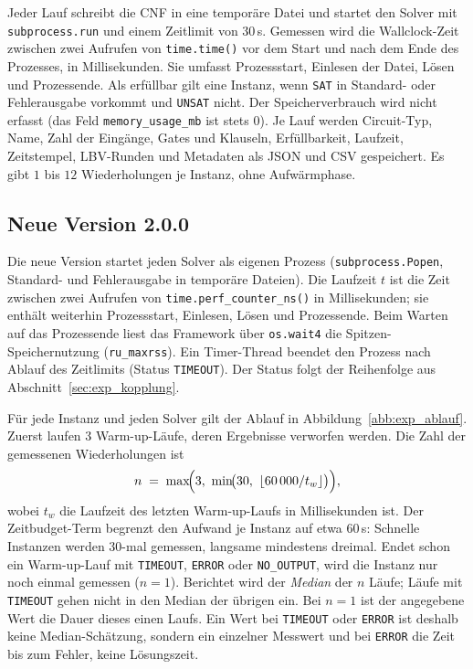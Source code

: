 Jeder Lauf schreibt die CNF in eine temporäre Datei und startet den Solver mit \texttt{subprocess.run} und einem Zeitlimit von $30$\,s. Gemessen wird die Wallclock-Zeit zwischen zwei Aufrufen von \texttt{time.time()} vor dem Start und nach dem Ende des Prozesses, in Millisekunden. Sie umfasst Prozessstart, Einlesen der Datei, Lösen und Prozessende. Als erfüllbar gilt eine Instanz, wenn \texttt{SAT} in Standard- oder Fehlerausgabe vorkommt und \texttt{UNSAT} nicht. Der Speicherverbrauch wird nicht erfasst (das Feld \texttt{memory\_usage\_mb} ist stets $0$). Je Lauf werden Circuit-Typ, Name, Zahl der Eingänge, Gates und Klauseln, Erfüllbarkeit, Laufzeit, Zeitstempel, LBV-Runden und Metadaten als JSON und CSV gespeichert. Es gibt $1$ bis $12$ Wiederholungen je Instanz, ohne Aufwärmphase.

\subsection{Neue Version 2.0.0}
\label{sec:exp_neue_messung}

Die neue Version startet jeden Solver als eigenen Prozess (\texttt{subprocess.Popen}, Standard- und Fehlerausgabe in temporäre Dateien). Die Laufzeit $t$ ist die Zeit zwischen zwei Aufrufen von \texttt{time.perf\_counter\_ns()} in Millisekunden; sie enthält weiterhin Prozessstart, Einlesen, Lösen und Prozessende. Beim Warten auf das Prozessende liest das Framework über \texttt{os.wait4} die Spitzen-Speichernutzung (\texttt{ru\_maxrss}). Ein Timer-Thread beendet den Prozess nach Ablauf des Zeitlimits (Status \texttt{TIMEOUT}). Der Status folgt der Reihenfolge aus Abschnitt~\ref{sec:exp_kopplung}.

Für jede Instanz und jeden Solver gilt der Ablauf in Abbildung~\ref{abb:exp_ablauf}. Zuerst laufen $3$ Warm-up-Läufe, deren Ergebnisse verworfen werden. Die Zahl der gemessenen Wiederholungen ist
\[
n \;=\; \max\!\Bigl(3,\ \min\!\bigl(30,\ \lfloor 60\,000/t_w\rfloor\bigr)\Bigr),
\]
wobei $t_w$ die Laufzeit des letzten Warm-up-Laufs in Millisekunden ist. Der Zeitbudget-Term begrenzt den Aufwand je Instanz auf etwa $60$\,s: Schnelle Instanzen werden $30$-mal gemessen, langsame mindestens dreimal. Endet schon ein Warm-up-Lauf mit \texttt{TIMEOUT}, \texttt{ERROR} oder \texttt{NO\_OUTPUT}, wird die Instanz nur noch einmal gemessen ($n=1$). Berichtet wird der \emph{Median} der $n$ Läufe; Läufe mit \texttt{TIMEOUT} gehen nicht in den Median der übrigen ein. Bei $n=1$ ist der angegebene Wert die Dauer dieses einen Laufs. Ein Wert bei \texttt{TIMEOUT} oder \texttt{ERROR} ist deshalb keine Median-Schätzung, sondern ein einzelner Messwert und bei \texttt{ERROR} die Zeit bis zum Fehler, keine Lösungszeit.

